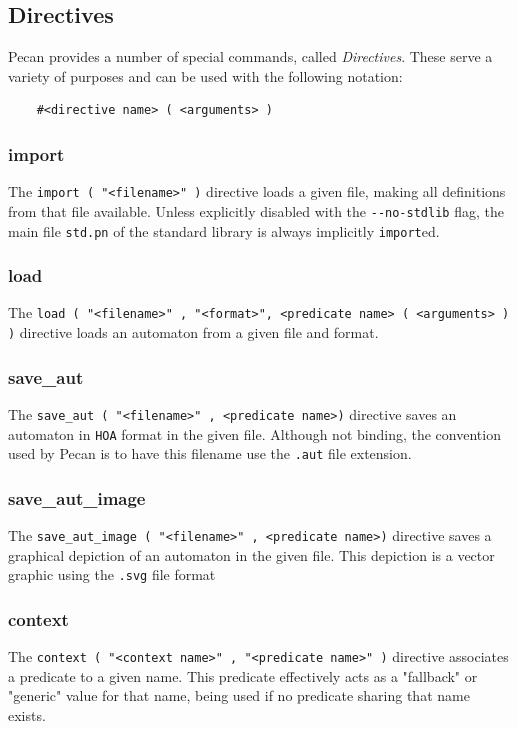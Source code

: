 \documentclass{report}
\begin{document}
\subsection{Directives}
Pecan provides a number of special commands, called \emph{Directives}.
These serve a variety of purposes and can be used with the following notation:
\begin{verbatim}
    #<directive name> ( <arguments> )
\end{verbatim}

\subsubsection{import}
The \verb+import ( "<filename>" )+ directive loads a given file, making all definitions from that file available.
Unless explicitly disabled with the \verb+--no-stdlib+ flag, the main file \verb+std.pn+ of the standard library is always implicitly \verb+import+ed.

\subsubsection{load}
The \verb+load ( "<filename>" , "<format>", <predicate name> ( <arguments> ) )+ directive loads an automaton from a given file and format.

\subsubsection{save\_aut}
The \verb+save_aut ( "<filename>" , <predicate name>)+ directive saves an automaton in \verb+HOA+ format in the given file.
Although not binding, the convention used by Pecan is to have this filename use the \verb+.aut+ file extension.

\subsubsection{save\_aut\_image}
The \verb+save_aut_image ( "<filename>" , <predicate name>)+ directive saves a graphical depiction of an automaton in the given file.
This depiction is a vector graphic using the \verb+.svg+ file format

\subsubsection{context}
The \verb+context ( "<context name>" , "<predicate name>" )+ directive associates a predicate to a given name.
This predicate effectively acts as a "fallback" or "generic" value for that name, being used if no predicate sharing that name exists.
\end{document}
